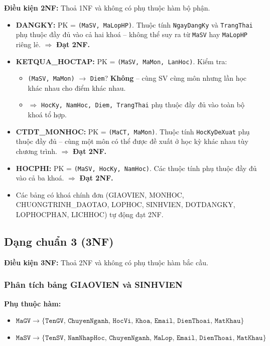 \documentclass[13pt, a4paper]{article}
\begin{document}
\noindent \textbf{Điều kiện 2NF:} Thoả 1NF và không có phụ thuộc hàm bộ phận.

\begin{itemize}[leftmargin=1.5cm]
  \item \textbf{DANGKY:} PK = \texttt{(MaSV, MaLopHP)}. Thuộc tính \texttt{NgayDangKy} và \texttt{TrangThai} phụ thuộc đầy đủ vào cả hai khoá -- không thể suy ra từ \texttt{MaSV} hay \texttt{MaLopHP} riêng lẻ. $\Rightarrow$ \textbf{Đạt 2NF.}
  \item \textbf{KETQUA\_HOCTAP:} PK = \texttt{(MaSV, MaMon, LanHoc)}. Kiểm tra:
    \begin{itemize}[leftmargin=1cm]
      \item \texttt{(MaSV, MaMon)} $\to$ \texttt{Diem}? \textbf{Không} -- cùng SV cùng môn nhưng lần học khác nhau cho điểm khác nhau.
      \item $\Rightarrow$ \texttt{HocKy, NamHoc, Diem, TrangThai} phụ thuộc đầy đủ vào toàn bộ khoá tổ hợp. \checkmark
    \end{itemize}
  \item \textbf{CTDT\_MONHOC:} PK = \texttt{(MaCT, MaMon)}. Thuộc tính \texttt{HocKyDeXuat} phụ thuộc đầy đủ -- cùng một môn có thể được đề xuất ở học kỳ khác nhau tùy chương trình. $\Rightarrow$ \textbf{Đạt 2NF.}
  \item \textbf{HOCPHI:} PK = \texttt{(MaSV, HocKy, NamHoc)}. Các thuộc tính phụ thuộc đầy đủ vào cả ba khoá. $\Rightarrow$ \textbf{Đạt 2NF.}
  \item Các bảng có khoá chính đơn (GIAOVIEN, MONHOC, CHUONGTRINH\_DAOTAO, LOPHOC, SINHVIEN, DOTDANGKY, LOPHOCPHAN, LICHHOC) tự động đạt 2NF. \checkmark
\end{itemize}

\subsection{Dạng chuẩn 3 (3NF)}

\noindent \textbf{Điều kiện 3NF:} Thoả 2NF và không có phụ thuộc hàm bắc cầu.

\subsubsection{Phân tích bảng GIAOVIEN và SINHVIEN}
\textbf{Phụ thuộc hàm:}
\begin{itemize}[leftmargin=1.5cm]
  \item $\texttt{MaGV} \to \{\texttt{TenGV, ChuyenNganh, HocVi, Khoa, Email, DienThoai, MatKhau}\}$
  \item $\texttt{MaSV} \to \{\texttt{TenSV, NamNhapHoc, ChuyenNganh, MaLop, Email, DienThoai, MatKhau}\}$
\end{itemize}
\end{document}
